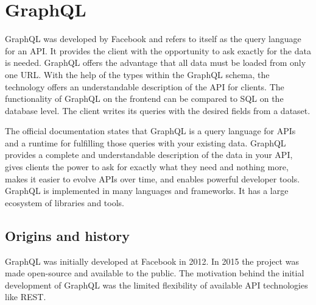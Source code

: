 \section{GraphQL}

GraphQL was developed by Facebook and refers to itself as the query language for an API. It provides the client with the opportunity to ask exactly for the data is needed. GraphQL offers the advantage that all data must be loaded from only one URL. With the help of the types within the GraphQL schema, the technology offers an understandable description of the
API for clients. \cite{misc:-:graphql-org} The functionality of GraphQL on the frontend can be compared to SQL on the database level. The client writes its queries with the desired fields from a dataset.

The official documentation states that GraphQL is a query language for APIs and a runtime for fulfilling those queries with your existing data. GraphQL provides a complete and understandable description of the data in your API, gives clients the power to ask for exactly what they need and nothing more, makes it easier to evolve APIs over time, and enables powerful developer tools. GraphQL is implemented in many languages and frameworks. It has a large ecosystem of libraries and tools.

\subsection{Origins and history}

GraphQL was initially developed at Facebook in 2012. In 2015 the project was made open-source and available to the public. The motivation behind the initial development of GraphQL was the limited flexibility of available API technologies like REST.



